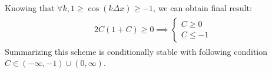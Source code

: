 	Knowing that $ \forall k,  1 \geq \cos(k\Delta x) \geq -1$, we can obtain final result:	
	\begin{align}	
		\begin{split}			
			2C(1+C)\geq 0 \implies 
			\begin{cases}
			C \geq 0 \\
			C \leq -1
			\end{cases}
		\end{split}
	\end{align} 	
	Summarizing this scheme is conditionally stable with following condition $C \in \left(-\infty, -1\right)\cup \left(0, \infty \right)$.
		